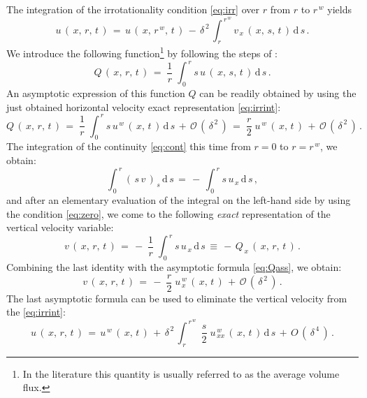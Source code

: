 \documentclass[alpha-refs, 12pt]{wiley-article}
\renewcommand{\O}{\mathcal{O}}
\begin{document}
The integration of the irrotationality condition \eqref{eq:irr} over $r$ from $r$ to $r^{\,w}$ yields
\begin{equation}\label{eq:irrint}
  u\,(\,x,\,r,\,t\,)\,=\,u\,(\,x,\,r^{\,w},\,t\,)\,-\,\delta^{\,2}\,\int_{\,r}^{\,r^{\,w}} v_{\,x}\,(\,x,\,s,\,t\,)\,\mathrm{d}\,s\,.
\end{equation}
We introduce the following function\footnote{In the literature this quantity is usually referred to as the average volume flux.} by following the steps of \cite{Mitsotakis2019}:
\begin{equation*}
  Q\,(\,x,\,r,\,t\,)\,=\;\frac{1}{r}\; \int_{\,0}^{\,r} s\,u\,(\,x,\,s,\,t\,)\,\mathrm{d}\,s\,.
\end{equation*}
An asymptotic expression of this function $Q$ can be readily obtained by using the just obtained horizontal velocity exact representation \eqref{eq:irrint}:
\begin{equation}\label{eq:Qass}
  Q\,(\,x,\,r,\,t\,)\,=\;\frac{1}{r}\; \int_{\,0}^{\,r}s\,u^{\,w}\,(\,x,\,t\,)\,\mathrm{d}\,s\,+\,\O\,(\,\delta^{\,2}\,)\,=\;\frac{r}{2}\;u^{\,w}\,(\,x,\,t\,)\,+\,\O\,(\,\delta^{\,2}\,)\,.
\end{equation}
The integration of the continuity \cref{eq:cont} this time from $r = 0$ to $r = r^{\,w}$, we obtain:
\begin{equation*}
  \int_{\,0}^{\,r}(\,s\,v\,)_{\,s}\,\mathrm{d}\,s\,=\,-\,\int_{\,0}^{\,r} s\,u_{\,x}\,\mathrm{d}\,s\,,
\end{equation*}
and after an elementary evaluation of the integral on the left-hand side by using the condition \eqref{eq:zero}, we come to the following \emph{exact} representation of the vertical velocity variable:
\begin{equation*}
  v\,(\,x,\,r,\,t\,)\,=\,-\;\frac{1}{r}\;\int_{\,0}^{\,r}s\,u_{\,x}\,\mathrm{d}\,s\, \equiv \,-\,Q_{\,x}\,(\,x,\,r,\,t\,)\,.
\end{equation*}
Combining the last identity with the asymptotic formula \eqref{eq:Qass}, we obtain:
\begin{equation}\label{eq:l6}
  v\,(\,x,\,r,\,t\,)\,=\,-\;\frac{r}{2}\;u^{\,w}_{\,x}\,(\,x,\,t\,)\,+\,\O\,(\,\delta^{\,2}\,)\,.
\end{equation}
The last asymptotic formula can be used to eliminate the vertical velocity from the \cref{eq:irrint}:
\begin{equation*}
  u\,(\,x,\,r,\,t\,)\,=\,u^{\,w}\,(\,x,\,t\,)\,+\,\delta^{\,2}\, \int_{\,r}^{\,r^{\,w}}\;\frac{s}{2}\;u^{\,w}_{\,xx}\,(\,x,\,t\,)\,\mathrm{d}\,s\,+\,O\,(\,\delta^{\,4}\,)\,.
\end{equation*}
\end{document}
